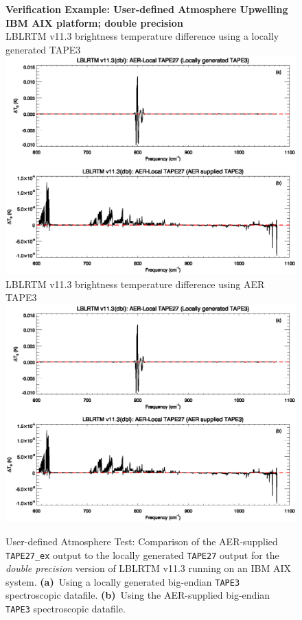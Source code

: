 \begin{figure}[htp]
  \centering
  \qquad\sffamily\textbf{Verification Example: User-defined Atmosphere Upwelling}\\
  \qquad\sffamily\textbf{IBM AIX platform; double precision}\\
  \qquad\textsf{LBLRTM v11.3 brightness temperature difference using a locally generated TAPE3}\\
  \includegraphics[bb=85 403 534 558,clip,scale=1.0]{graphics/run_example_user_defined_upwelling/dbl_ibm.eps}
  \qquad\textsf{LBLRTM v11.3 brightness temperature difference using AER TAPE3}\\
  \includegraphics[bb=85 226 534 381,clip,scale=1.0]{graphics/run_example_user_defined_upwelling/dbl_ibm.eps}
  \caption{User-defined Atmosphere Test: Comparison of the AER-supplied \texttt{TAPE27\_ex} output to the locally generated \texttt{TAPE27} output for the \textsl{double precision} version of LBLRTM v11.3 running on an IBM AIX system. \mbox{\textbf{(a)} Using} a locally generated big-endian \texttt{TAPE3} spectroscopic datafile. \mbox{\textbf{(b)} Using} the AER-supplied big-endian \texttt{TAPE3} spectroscopic datafile.}
  \label{fig:run_example_user_defined_upwelling-dbl_ibm}
\end{figure}

